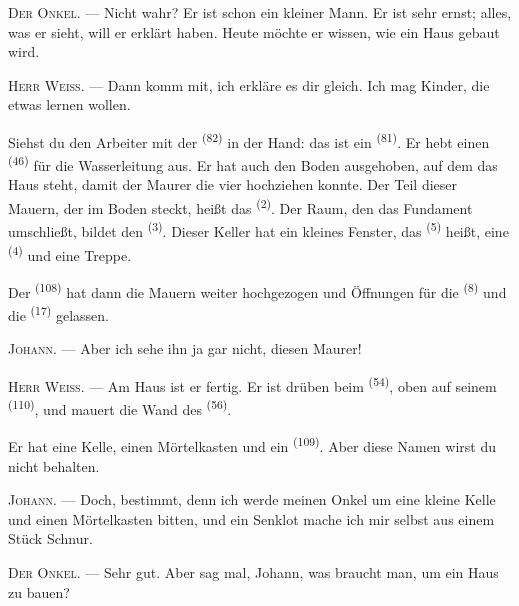 \textsc{Der Onkel}. --- Nicht wahr? Er ist schon ein kleiner Mann. Er ist sehr
ernst; alles, was er sieht, will er erklärt haben. Heute möchte er wissen, wie ein
Haus gebaut wird.

\VUsaut{3.0mm}

\textsc{Herr Weiß}. --- Dann komm mit, ich erkläre es dir gleich. Ich mag Kinder,
die etwas lernen wollen.

Siehst du den Arbeiter mit der  \textsuperscript{(82)} in der Hand:
das ist ein  \textsuperscript{(81)}. Er hebt einen
 \textsuperscript{(46)} für die Wasserleitung aus. Er hat auch den
Boden ausgehoben, auf dem das Haus steht, damit der Maurer die vier
 hochziehen konnte. Der Teil dieser Mauern, der im Boden steckt,
heißt das  \textsuperscript{(2)}. Der Raum, den das Fundament
umschließt, bildet den  \textsuperscript{(3)}. Dieser Keller hat ein
kleines Fenster, das  \textsuperscript{(5)} heißt, eine
 \textsuperscript{(4)} und eine Treppe.

Der  \textsuperscript{(108)} hat dann die Mauern weiter hochgezogen und
Öffnungen für die  \textsuperscript{(8)} und die 
\textsuperscript{(17)} gelassen.

\textsc{Johann}. --- Aber ich sehe ihn ja gar nicht, diesen Maurer!

\textsc{Herr Weiß}. --- Am Haus ist er fertig. Er ist drüben beim 
\textsuperscript{(54)}, oben auf seinem  \textsuperscript{(110)}, und
mauert die Wand des  \textsuperscript{(56)}.

Er hat eine Kelle, einen Mörtelkasten und ein 
\textsuperscript{(109)}. Aber diese Namen wirst du nicht behalten.

\textsc{Johann}. --- Doch, bestimmt, denn ich werde meinen Onkel um eine kleine
Kelle und einen Mörtelkasten bitten, und ein Senklot mache ich mir selbst aus
einem Stück Schnur.

\VUsaut{3.0mm}
\VUsaut{3.0mm}

\textsc{Der Onkel}. --- Sehr gut. Aber sag mal, Johann, was braucht man, um ein
Haus zu bauen?

